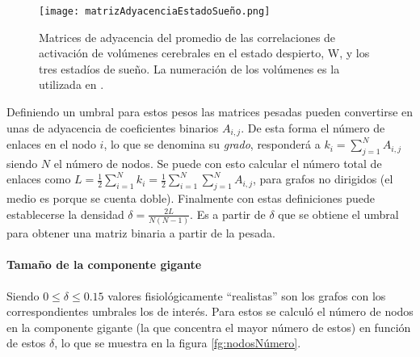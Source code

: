 \documentclass{article}
\begin{document}
\begin{figure}[ht]
  \centering
  \texttt{[image: matrizAdyacenciaEstadoSueño.png]}
  \caption{Matrices de adyacencia del promedio de las correlaciones de activación de volúmenes cerebrales en el estado despierto, W, y los tres estadíos de sueño. La numeración de los volúmenes es la utilizada en \cite{tzourio-mazoyer_automated_2002}.
	}
	\label{fg:matrizAdyacenciaEstadoSueño}
\end{figure}

Definiendo un umbral para estos pesos las matrices pesadas pueden convertirse en unas de adyacencia de coeficientes binarios $A_{i,j}$.
De esta forma el número de enlaces en el nodo $i$, lo que se denomina su \emph{grado}, responderá a $k_i = \sum_{j=1}^N A_{i,j}$ siendo $N$ el número de nodos.
Se puede con esto calcular el número total de enlaces como $L = \frac{1}{2} \sum_{i=1}^N k_i = \frac{1}{2} \sum_{i=1}^N \sum_{j=1}^N A_{i,j}$, para grafos no dirigidos (el medio es porque se cuenta doble).
Finalmente con estas definiciones puede establecerse la densidad $\delta = \frac{2 L}{N (N - 1)}$.
Es a partir de $\delta$ que se obtiene el umbral para obtener una matriz binaria a partir de la pesada.



\paragraph*{Tamaño de la componente gigante}
Siendo $0 \leq \delta \leq 0.15$ valores fisiológicamente ``realistas'' son los grafos con los correspondientes umbrales los de interés.
Para estos se calculó el número de nodos en la componente gigante (la que concentra el mayor número de estos) en función de estos $\delta$, lo que se muestra en la figura \ref{fg:nodosNúmero}.

\end{document}
